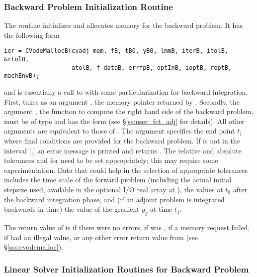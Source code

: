 \subsubsection{Backward Problem Initialization Routine}\label{sss:cvodemallocb}

The routine  initializes and allocates memory for the backward
problem. It has the following form
\begin{verbatim}
ier = CVodeMallocB(cvadj_mem, fB, tB0, yB0, lmmB, iterB, itolB, &rtolB, 
                   atolB, f_dataB, errfpB, optInB, ioptB, roptB, machEnvB);
\end{verbatim}
and is essentially a call to  with some particularization for 
backward integration. First,  takes as an argument 
, the memory pointer returned by .
Secondly, the argument , the {\C} function to compute the right hand side 
of the backward problem, must be of type  and
has the form  
(see \S\ref{ss:user_fct_adj} for details). 
All other arguments are equivalent to those of . The argument
 specifies the end point $t_1$ where final conditions are provided for
the backward problem. If  is not in the interval $[$,$]$
an error message is printed and  returns .
The relative and absolute tolerances  and  for  need
to be set appropriately; this may require some experimentation. Data that could
help in the selection of appropriate tolerances includes the time scale of the
forward problem (including the actual initial stepsize used, available in the
optional I/O real array at ), the  values at $t_0$ after
the backward integration phase, and (if an adjoint problem is integrated 
backwards in time) the value of the gradient $g_y$ at time $t_1$.

The return value of  is  if there were no errors,
 if  was , 
if a memory request failed,  if  had an illegal value,
or any other error return value from  (see \S\ref{sss:cvodemalloc}).

\subsubsection{Linear Solver Initialization Routines for Backward Problem}\label{sss:lin_solv_b}

